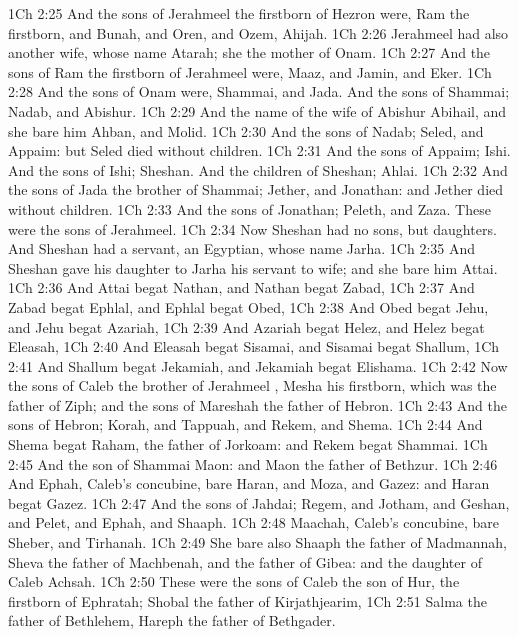 \vs 1Ch 2:25 And the sons of Jerahmeel the firstborn of Hezron were, Ram the firstborn, and Bunah, and Oren, and Ozem,  Ahijah.
\vs 1Ch 2:26 Jerahmeel had also another wife, whose name  Atarah; she  the mother of Onam.
\vs 1Ch 2:27 And the sons of Ram the firstborn of Jerahmeel were, Maaz, and Jamin, and Eker.
\vs 1Ch 2:28 And the sons of Onam were, Shammai, and Jada. And the sons of Shammai; Nadab, and Abishur.
\vs 1Ch 2:29 And the name of the wife of Abishur  Abihail, and she bare him Ahban, and Molid.
\vs 1Ch 2:30 And the sons of Nadab; Seled, and Appaim: but Seled died without children.
\vs 1Ch 2:31 And the sons of Appaim; Ishi. And the sons of Ishi; Sheshan. And the children of Sheshan; Ahlai.
\vs 1Ch 2:32 And the sons of Jada the brother of Shammai; Jether, and Jonathan: and Jether died without children.
\vs 1Ch 2:33 And the sons of Jonathan; Peleth, and Zaza. These were the sons of Jerahmeel.
\vs 1Ch 2:34 Now Sheshan had no sons, but daughters. And Sheshan had a servant, an Egyptian, whose name  Jarha.
\vs 1Ch 2:35 And Sheshan gave his daughter to Jarha his servant to wife; and she bare him Attai.
\vs 1Ch 2:36 And Attai begat Nathan, and Nathan begat Zabad,
\vs 1Ch 2:37 And Zabad begat Ephlal, and Ephlal begat Obed,
\vs 1Ch 2:38 And Obed begat Jehu, and Jehu begat Azariah,
\vs 1Ch 2:39 And Azariah begat Helez, and Helez begat Eleasah,
\vs 1Ch 2:40 And Eleasah begat Sisamai, and Sisamai begat Shallum,
\vs 1Ch 2:41 And Shallum begat Jekamiah, and Jekamiah begat Elishama.
\vs 1Ch 2:42 Now the sons of Caleb the brother of Jerahmeel , Mesha his firstborn, which was the father of Ziph; and the sons of Mareshah the father of Hebron.
\vs 1Ch 2:43 And the sons of Hebron; Korah, and Tappuah, and Rekem, and Shema.
\vs 1Ch 2:44 And Shema begat Raham, the father of Jorkoam: and Rekem begat Shammai.
\vs 1Ch 2:45 And the son of Shammai  Maon: and Maon  the father of Bethzur.
\vs 1Ch 2:46 And Ephah, Caleb's concubine, bare Haran, and Moza, and Gazez: and Haran begat Gazez.
\vs 1Ch 2:47 And the sons of Jahdai; Regem, and Jotham, and Geshan, and Pelet, and Ephah, and Shaaph.
\vs 1Ch 2:48 Maachah, Caleb's concubine, bare Sheber, and Tirhanah.
\vs 1Ch 2:49 She bare also Shaaph the father of Madmannah, Sheva the father of Machbenah, and the father of Gibea: and the daughter of Caleb  Achsah.
\vs 1Ch 2:50 These were the sons of Caleb the son of Hur, the firstborn of Ephratah; Shobal the father of Kirjathjearim,
\vs 1Ch 2:51 Salma the father of Bethlehem, Hareph the father of Bethgader.
